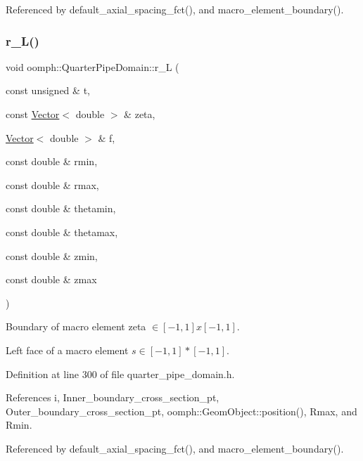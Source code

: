 Referenced by default\+\_\+axial\+\_\+spacing\+\_\+fct(), and macro\+\_\+element\+\_\+boundary().

\mbox{\label{classoomph_1_1QuarterPipeDomain_a21c58b76f546300c308d6e1f303a3433}} 
\subsubsection{\texorpdfstring{r\+\_\+\+L()}{r\_L()}}
{\footnotesize\ttfamily void oomph\+::\+Quarter\+Pipe\+Domain\+::r\+\_\+L (\begin{DoxyParamCaption}\item[{const unsigned \&}]{t,  }\item[{const \hyperlink{classoomph_1_1Vector}{Vector}$<$ double $>$ \&}]{zeta,  }\item[{\hyperlink{classoomph_1_1Vector}{Vector}$<$ double $>$ \&}]{f,  }\item[{const double \&}]{rmin,  }\item[{const double \&}]{rmax,  }\item[{const double \&}]{thetamin,  }\item[{const double \&}]{thetamax,  }\item[{const double \&}]{zmin,  }\item[{const double \&}]{zmax }\end{DoxyParamCaption})\hspace{0.3cm}{\ttfamily [private]}}



Boundary of macro element zeta $ \in [-1,1]x[-1,1] $. 

Left face of a macro element $ s \in [-1,1]*[-1,1] $. 

Definition at line 300 of file quarter\+\_\+pipe\+\_\+domain.\+h.



References i, Inner\+\_\+boundary\+\_\+cross\+\_\+section\+\_\+pt, Outer\+\_\+boundary\+\_\+cross\+\_\+section\+\_\+pt, oomph\+::\+Geom\+Object\+::position(), Rmax, and Rmin.



Referenced by default\+\_\+axial\+\_\+spacing\+\_\+fct(), and macro\+\_\+element\+\_\+boundary().

\mbox{\label{classoomph_1_1QuarterPipeDomain_aab6f3fd79bc6dea1eb267f3b55630a2b}} 
